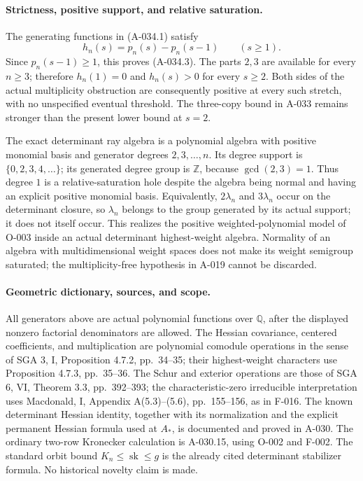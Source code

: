 \paragraph{Strictness, positive support, and relative saturation.}
The generating functions in (A-034.1) satisfy
\[
             h_n(s)=p_n(s)-p_n(s-1)\qquad(s\geq1).
 \]
Since \(p_n(s-1)\geq1\), this proves (A-034.3).
The parts \(2,3\) are available for every \(n\geq3\);
therefore \(h_n(1)=0\) and \(h_n(s)>0\) for every
\(s\geq2\). Both sides of the actual multiplicity
obstruction are consequently positive at every such
stretch, with no unspecified eventual threshold.
The three-copy bound in A-033 remains stronger than
the present lower bound at \(s=2\).

The exact determinant ray algebra is a polynomial
algebra with positive monomial basis and generator
degrees \(2,3,\ldots,n\). Its degree support is
\(\{0,2,3,4,\ldots\}\); its generated degree group
is \(\mathbb Z\), because \(\gcd(2,3)=1\).
Thus degree \(1\) is a relative-saturation hole
despite the algebra being normal and having an
explicit positive monomial basis. Equivalently,
\(2\lambda_n\) and \(3\lambda_n\) occur on the
determinant closure, so \(\lambda_n\) belongs to
the group generated by its actual support; it
does not itself occur. This realizes the positive
weighted-polynomial model of O-003 inside an actual
determinant highest-weight algebra.
Normality of an algebra with multidimensional weight
spaces does not make its weight semigroup saturated;
the multiplicity-free hypothesis in A-019 cannot be
discarded.

\paragraph{Geometric dictionary, sources, and scope.}
All generators above are actual polynomial functions
over \(\mathbb Q\), after the displayed nonzero
factorial denominators are allowed. The Hessian
covariance, centered coefficients, and multiplication
are polynomial comodule operations in the sense of
SGA 3, I, Proposition 4.7.2, pp.~34--35; their
highest-weight characters use Proposition 4.7.3,
pp.~35--36. The Schur and exterior operations are
those of SGA 6, VI, Theorem 3.3, pp.~392--393;
the characteristic-zero irreducible interpretation
uses Macdonald, I, Appendix A(5.3)--(5.6),
pp.~155--156, as in F-016.
The known determinant Hessian identity, together
with its normalization and the explicit permanent
Hessian formula used at \(A_*\), is documented and
proved in A-030. The ordinary two-row Kronecker
calculation is A-030.15, using O-002 and F-002.
The standard orbit bound \(K_n\leq\operatorname{sk}\leq g\)
is the already cited determinant stabilizer formula.
No historical novelty claim is made.

